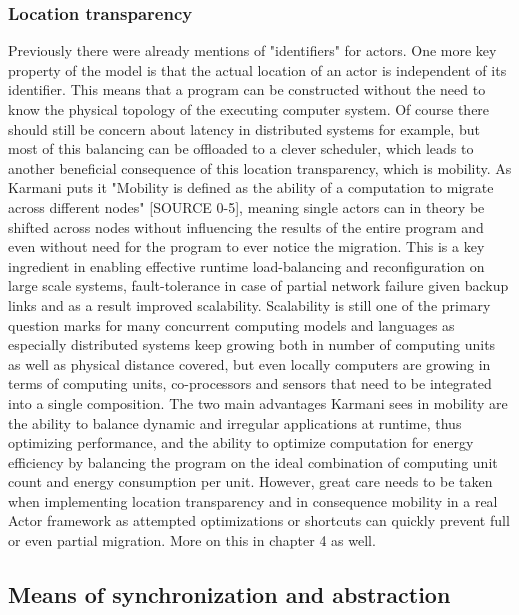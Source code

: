 \documentclass[A4]{article}
\begin{document}
\subsubsection{Location transparency}
Previously there were already mentions of "identifiers" for actors. One more key property of the model is that the actual location of an actor is independent of its identifier. This means that a program can be constructed without the need to know the physical topology of the executing computer system. Of course there should still be concern about latency in distributed systems for example, but most of this balancing can be offloaded to a clever scheduler, which leads to another beneficial consequence of this location transparency, which is mobility.
As Karmani puts it "Mobility is defined as the ability of a computation to migrate across different nodes" [SOURCE 0-5], meaning single actors can in theory be shifted across nodes without influencing the results of the entire program and even without need for the program to ever notice the migration. This is a key ingredient in enabling effective runtime load-balancing and reconfiguration on large scale systems, fault-tolerance in case of partial network failure given backup links and as a result improved scalability. Scalability is still one of the primary question marks for many concurrent computing models and languages as especially distributed systems keep growing both in number of computing units as well as physical distance covered, but even locally computers are growing in terms of computing units, co-processors and sensors that need to be integrated into a single composition. 
The two main advantages Karmani sees in mobility are the ability to balance dynamic and irregular applications at runtime, thus optimizing performance, and the ability to optimize computation for energy efficiency by balancing the program on the ideal combination of computing unit count and energy consumption per unit. 
However, great care needs to be taken when implementing location transparency and in consequence mobility in a real Actor framework as attempted optimizations or shortcuts can quickly prevent full or even partial migration. More on this in chapter 4 as well. 

\subsection{Means of synchronization and abstraction}
\end{document}
